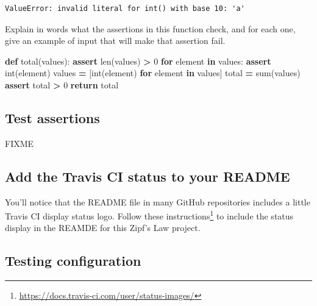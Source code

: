 \documentclass[
]{krantz}
\makeatletter
\newenvironment{Shaded}{\begin{snugshade}}{\end{snugshade}}
\newcommand{\BuiltInTok}[1]{#1}
\newcommand{\ControlFlowTok}[1]{\textcolor[rgb]{0.13,0.29,0.53}{\textbf{#1}}}
\newcommand{\DecValTok}[1]{\textcolor[rgb]{0.00,0.00,0.81}{#1}}
\newcommand{\KeywordTok}[1]{\textcolor[rgb]{0.13,0.29,0.53}{\textbf{#1}}}
\newcommand{\NormalTok}[1]{#1}
\newcommand{\OperatorTok}[1]{\textcolor[rgb]{0.81,0.36,0.00}{\textbf{#1}}}
\renewcommand{\href}[2]{#2\footnote{\url{#1}}}
\newenvironment{kframe}{%
\medskip{}
\setlength{\fboxsep}{.8em}
 \def\at@end@of@kframe{}%
 \ifinner\ifhmode%
  \def\at@end@of@kframe{\end{minipage}}%
  \begin{minipage}{\columnwidth}%
 \fi\fi%
 \def\FrameCommand##1{\hskip\@totalleftmargin \hskip-\fboxsep
 \colorbox{shadecolor}{##1}\hskip-\fboxsep
     \hskip-\linewidth \hskip-\@totalleftmargin \hskip\columnwidth}%
 \MakeFramed {\advance\hsize-\width
   \@totalleftmargin\z@ \linewidth\hsize
   \@setminipage}}%
 {\par\unskip\endMakeFramed%
 \at@end@of@kframe}
\renewenvironment{Shaded}{\begin{kframe}}{\end{kframe}}
\makeatother
\begin{document}
\begin{verbatim}
ValueError: invalid literal for int() with base 10: 'a'
\end{verbatim}

Explain in words what the assertions in this function check,
and for each one,
give an example of input that will make that assertion fail.

\begin{Shaded}
\begin{Highlighting}[]
\KeywordTok{def}\NormalTok{ total(values):}
    \ControlFlowTok{assert} \BuiltInTok{len}\NormalTok{(values) }\OperatorTok{\textgreater{}} \DecValTok{0}
    \ControlFlowTok{for}\NormalTok{ element }\KeywordTok{in}\NormalTok{ values:}
        \ControlFlowTok{assert} \BuiltInTok{int}\NormalTok{(element)}
\NormalTok{    values }\OperatorTok{=}\NormalTok{ [}\BuiltInTok{int}\NormalTok{(element) }\ControlFlowTok{for}\NormalTok{ element }\KeywordTok{in}\NormalTok{ values]}
\NormalTok{    total }\OperatorTok{=} \BuiltInTok{sum}\NormalTok{(values)}
    \ControlFlowTok{assert}\NormalTok{ total }\OperatorTok{\textgreater{}} \DecValTok{0}
    \ControlFlowTok{return}\NormalTok{ total}
\end{Highlighting}
\end{Shaded}

\hypertarget{testing-ex-test-assert}{%
\subsection{Test assertions}\label{testing-ex-test-assert}}

FIXME

\hypertarget{testing-ex-ci-status-readme}{%
\subsection{Add the Travis CI status to your README}\label{testing-ex-ci-status-readme}}

You'll notice that the README file in many GitHub repositories includes a little
Travis CI display status logo.
Follow \href{https://docs.travis-ci.com/user/status-images/}{these instructions} to include
the status display in the REAMDE for this Zipf's Law project.

\hypertarget{testing-ex-config}{%
\subsection{Testing configuration}\label{testing-ex-config}}
\end{document}
